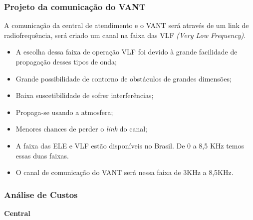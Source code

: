 \subsubsection{Projeto da comunicação do VANT}
A comunicação da central de atendimento e o VANT será através de um link de radiofrequência, será criado um canal na faixa das VLF
\textit{(Very Low Frequency)}.

\begin{itemize}
	\item A escolha dessa faixa de operação VLF foi devido à grande facilidade de propagação desses tipos de onda;
	\item Grande possibilidade de contorno de obstáculos de grandes dimensões;
	\item Baixa suscetibilidade de sofrer interferências;
	\item Propaga-se usando a atmosfera;
	\item Menores chances de perder o \textit{link} do canal;
	\item A faixa das ELE e VLF estão disponíveis no Brasil. De 0 a 8,5 KHz temos essas duas faixas.
	\item O canal de comunicação do VANT será nessa faixa de 3KHz a 8,5KHz.
\end{itemize}

\pagebreak

\subsubsection{Análise de Custos}

\indent \textbf{Central}

